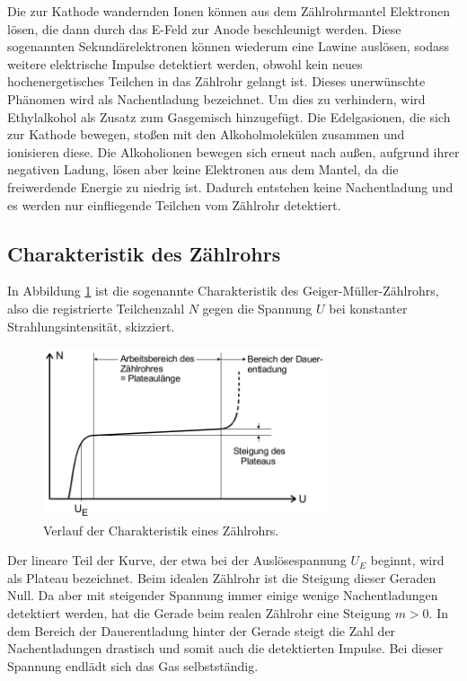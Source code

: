 Die zur Kathode wandernden Ionen können aus dem Zählrohrmantel Elektronen lösen,
die dann durch das E-Feld zur Anode beschleunigt werden. Diese sogenannten
Sekundärelektronen können wiederum eine Lawine auslösen, sodass weitere
elektrische Impulse detektiert werden, obwohl kein neues hochenergetisches
Teilchen in das Zählrohr gelangt ist. Dieses unerwünschte Phänomen
wird als Nachentladung bezeichnet. Um dies zu verhindern, wird
Ethylalkohol als Zusatz zum Gasgemisch hinzugefügt. Die Edelgasionen, die
sich zur Kathode bewegen, stoßen mit den Alkoholmolekülen zusammen und
ionisieren diese. Die Alkoholionen bewegen sich erneut nach außen, aufgrund
ihrer negativen Ladung, lösen aber keine Elektronen aus dem Mantel, da
die freiwerdende Energie zu niedrig ist. Dadurch entstehen keine Nachentladung
und es werden nur einfliegende Teilchen vom Zählrohr detektiert.

\subsection{Charakteristik des Zählrohrs}

In Abbildung \ref{fig:GMB} ist die sogenannte Charakteristik des
Geiger-Müller-Zählrohrs, also die registrierte Teilchenzahl $N$ gegen die
Spannung $U$ bei konstanter Strahlungsintensität, skizziert.

\begin{figure}
  \centering
  \includegraphics[height=5cm]{MeinePics;)/GMB.png}
  \caption{Verlauf der Charakteristik eines Zählrohrs.\cite{anleitung}}
  \label{fig:GMB}
\end{figure}

\FloatBarrier

Der lineare Teil der Kurve, der etwa bei der Auslösespannung $U_E$ beginnt,
wird als Plateau bezeichnet.
Beim idealen Zählrohr ist die Steigung dieser Geraden Null. Da aber mit
steigender Spannung immer einige wenige Nachentladungen detektiert werden,
hat die Gerade beim realen Zählrohr eine Steigung $m > 0$.
In dem Bereich der Dauerentladung hinter der Gerade steigt die Zahl der
Nachentladungen drastisch und somit auch die detektierten Impulse.
Bei dieser Spannung endlädt sich das Gas selbstständig.

